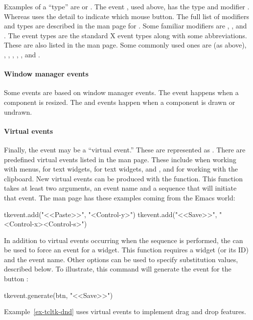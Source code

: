Examples of a ``type'' are  or
. The event , used
above, has the type  and modifier . Whereas
 uses the detail  to indicate
which mouse button. The full list of modifiers and types are described
in the man page for . Some familiar modifiers are
, ,  and . The event
types are the standard X event types along with some
abbreviations. These are also listed in the  man page. Some
commonly used ones are  (as above), ,
, , ,
, and .

\paragraph{Window manager events}
Some events are based on window manager events. The 
event happens when a component is resized. The  and
 events happen when a component is drawn or undrawn.

\paragraph{Virtual events}
Finally, the event may be a ``virtual event.'' These are represented
as . There are predefined virtual
events listed in the  man page. These include
 when working with menus,
 for text widgets,
 for text widgets, and
,  and
 for working with the clipboard. New
virtual events can be produced with the 
function. This function takes at least two arguments, an event name and a
sequence that will initiate that event. The  man page has
these examples coming from the Emacs world:
\begin{Schunk}
\begin{Sinput}
  tkevent.add("<<Paste>>", "<Control-y>")
  tkevent.add("<<Save>>", "<Control-x><Control-s>")
\end{Sinput}
\end{Schunk}
%
In addition to virtual events occurring when the sequence is performed,
the  can be used to force an event for a
widget. This function requires a widget (or its ID) and the event
name. Other options can be used to specify substitution values,
described below. To illustrate, this command will generate the
 event for the button :
\begin{Schunk}
\begin{Sinput}
 tkevent.generate(btn, "<<Save>>")
\end{Sinput}
\end{Schunk}
%
Example~\ref{ex-tcltk-dnd} uses virtual events to implement drag and
drop features.


